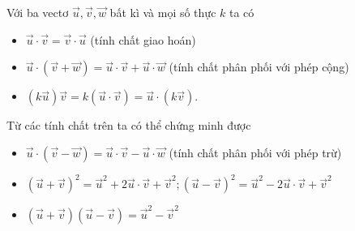 \begin{tc}
	Với ba vectơ $\vec{u},\vec{v},\vec{w}$ bất kì và mọi số thực $k$ ta có
	\begin{itemize}
		\item $\vec{u}\cdot \vec{v}=\vec{v}\cdot \vec{u}$ (tính chất giao hoán)
		\item $\vec{u} \cdot \left(\vec{v}+\vec{w}\right)=\vec{u}\cdot \vec{v}+\vec{u}\cdot \vec{w}$ (tính chất phân phối với phép cộng)
		\item $\left(k\vec{u}\right)\vec{v}=k\left(\vec{u}\cdot \vec{v}\right)=\vec{u}\cdot \left(k\vec{v}\right)$.
	\end{itemize}
\end{tc}
\begin{note}
	Từ các tính chất trên ta có thể chứng minh được
	\begin{itemize}
		\item $\vec{u} \cdot \left(\vec{v}-\vec{w}\right)=\vec{u}\cdot \vec{v}-\vec{u}\cdot \vec{w}$ (tính chất phân phối với phép trừ)
		\item $\left(\vec{u}+\vec{v}\right)^2=\vec{u}^2+2\vec{u}\cdot\vec{v} +\vec{v}^2; \left(\vec{u}-\vec{v}\right)^2=\vec{u}^2-2\vec{u}\cdot\vec{v} +\vec{v}^2 $
		\item $\left(\vec{u}+\vec{v}\right)\left(\vec{u}-\vec{v}\right)=\vec{u}^2-\vec{v}^2$
	\end{itemize}
\end{note}

